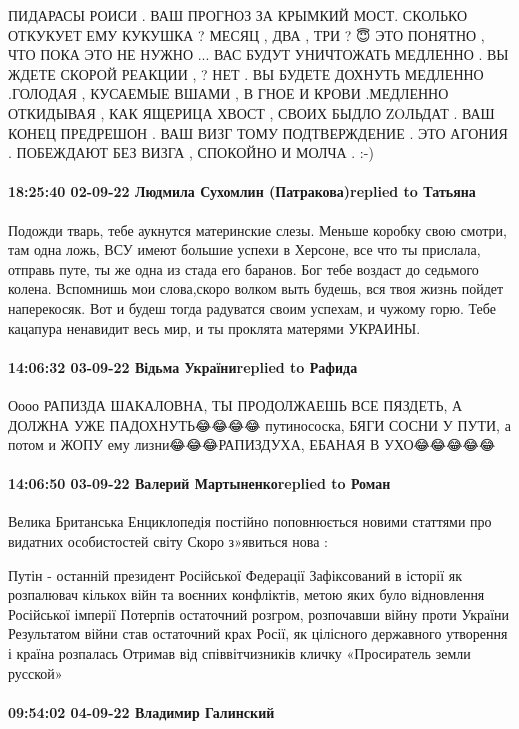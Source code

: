 ПИДАРАСЫ РОИСИ . ВАШ ПРОГНОЗ ЗА КРЫМКИЙ МОСТ. СКОЛЬКО ОТКУКУЕТ ЕМУ КУКУШКА ?
МЕСЯЦ , ДВА , ТРИ ? 😇 ЭТО ПОНЯТНО , ЧТО ПОКА ЭТО НЕ НУЖНО ... ВАС БУДУТ
УНИЧТОЖАТЬ МЕДЛЕННО . ВЫ ЖДЕТЕ СКОРОЙ РЕАКЦИИ , ? НЕТ . ВЫ БУДЕТЕ ДОХНУТЬ
МЕДЛЕННО .ГОЛОДАЯ , КУСАЕМЫЕ ВШАМИ , В ГНОЕ И КРОВИ .МЕДЛЕННО ОТКИДЫВАЯ , КАК
ЯЩЕРИЦА ХВОСТ , СВОИХ БЫДЛО ZOЛЬДАТ . ВАШ КОНЕЦ ПРЕДРЕШОН . ВАШ ВИЗГ ТОМУ
ПОДТВЕРЖДЕНИЕ . ЭТО АГОНИЯ . ПОБЕЖДАЮТ БЕЗ ВИЗГА , СПОКОЙНО И МОЛЧА . :-)


\paragraph{18:25:40 02-09-22 Людмила Сухомлин (Патракова)replied to Татьяна}

Подожди тварь, тебе аукнутся материнские слезы. Меньше коробку свою смотри, там
одна ложь, ВСУ имеют большие успехи в Херсоне, все что ты прислала, отправь
путе, ты же одна из стада его баранов. Бог тебе воздаст до седьмого колена.
Вспомнишь мои слова,скоро волком выть будешь, вся твоя жизнь пойдет
наперекосяк. Вот и будеш тогда радуватся своим успехам, и чужому горю. Тебе
кацапура ненавидит весь мир, и ты проклята матерями УКРАИНЫ.

\paragraph{14:06:32 03-09-22 Відьма Україниreplied to Рафида}

Оооо РАПИЗДА ШАКАЛОВНА, ТЫ ПРОДОЛЖАЕШЬ ВСЕ ПЯЗДЕТЬ, А ДОЛЖНА УЖЕ
ПАДОХНУТЬ😂😂😂😂 путинососка, БЯГИ СОСНИ У ПУТИ, а потом и ЖОПУ ему
лизни😂😂😂РАПИЗДУХА, ЕБАНАЯ В УХО😂😂😂😂😂

\paragraph{14:06:50 03-09-22 Валерий Мартыненкоreplied to Роман}

Велика Британська Енциклопедія постійно поповнюється новими статтями про
видатних особистостей світу Скоро з»явиться нова :

Путін - останній президент Російської Федерації Зафіксований в історії як
розпалювач кількох війн та воєнних конфліктів, метою яких було відновлення
Російської імперії Потерпів остаточний розгром, розпочавши війну проти України
Результатом війни став остаточний крах Росії, як цілісного державного утворення
і країна розпалась Отримав від співвітчизників кличку «Просиратель земли
русской»

\paragraph{09:54:02 04-09-22 Владимир Галинский}


